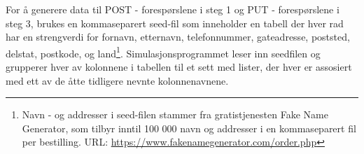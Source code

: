 For å generere data til POST - forespørslene i steg 1 og PUT - forespørslene i steg 3, brukes en komma\-separert seed-fil som inneholder en tabell der hver rad har en strengverdi for fornavn, etternavn, telefonnummer, gateadresse, poststed, delstat, postkode, og land\footnote{Navn - og addresser i seed-filen stammer fra gratistjenesten Fake Name Generator, som tilbyr inntil 100 000 navn og addresser i en kommaseparert fil per bestilling. URL: \url{https://www.fakenamegenerator.com/order.php}}. Simulasjonsprogrammet leser inn seedfilen og grupperer hver av kolonnene i tabellen til et sett med lister, der hver er assosiert med ett av de åtte tidligere nevnte kolonnenavnene.

